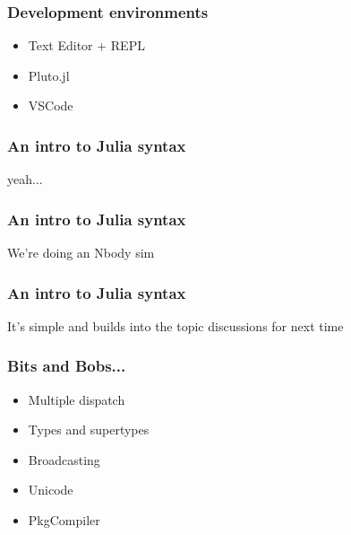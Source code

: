\documentclass{beamer}
\begin{document}
\begin{frame}
\frametitle{Development environments}

\begin{itemize}
\item Text Editor + REPL
\item Pluto.jl
\item VSCode
\end{itemize}

\end{frame}

\begin{frame}
\frametitle{An intro to Julia syntax}
\center yeah...
\end{frame}

\begin{frame}
\frametitle{An intro to Julia syntax}
\center We're doing an Nbody sim
\end{frame}

\begin{frame}
\frametitle{An intro to Julia syntax}
\center It's simple and builds into the topic discussions for next time
\end{frame}

\begin{frame}
\frametitle{Bits and Bobs...}
\begin{itemize}
\item Multiple dispatch
\item Types and supertypes
\item Broadcasting
\item Unicode
\item PkgCompiler
\end{itemize}
\end{frame}
\end{document}
